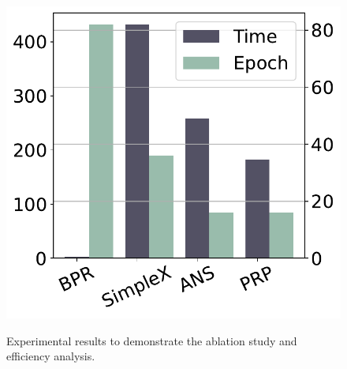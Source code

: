 \begin{figure}[t]
{\begin{minipage}[t]{0.207\linewidth}
\centering
\includegraphics[width=\linewidth]{fig/time_Yelp.pdf}
\label{fig:time_Yelp}
\end{minipage}
}
\caption{Experimental results to demonstrate the ablation study and efficiency analysis.}
\label{fig:trap}
\end{figure}

